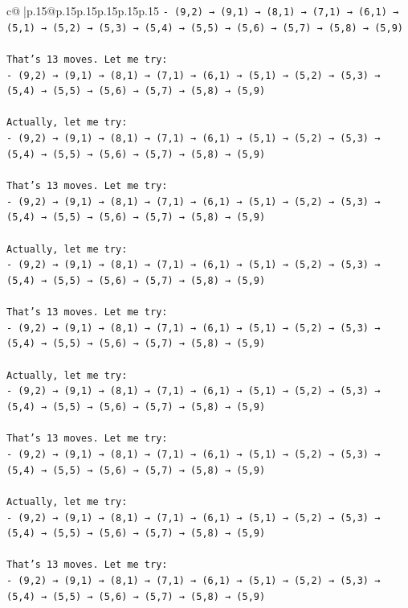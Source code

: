 \documentclass{article}
\begin{document}
{\begin{supertabular}{c@{$\;$}|p{.15\linewidth}@{}p{.15\linewidth}p{.15\linewidth}p{.15\linewidth}p{.15\linewidth}p{.15\linewidth}}
{{{\texttt{{-} (9,2) → (9,1) → (8,1) → (7,1) → (6,1) → (5,1) → (5,2) → (5,3) → (5,4) → (5,5) → (5,6) → (5,7) → (5,8) → (5,9)} \\
\\ 
\texttt{That's 13 moves. Let me try:} \\
\texttt{{-} (9,2) → (9,1) → (8,1) → (7,1) → (6,1) → (5,1) → (5,2) → (5,3) → (5,4) → (5,5) → (5,6) → (5,7) → (5,8) → (5,9)} \\
\\ 
\texttt{Actually, let me try:} \\
\texttt{{-} (9,2) → (9,1) → (8,1) → (7,1) → (6,1) → (5,1) → (5,2) → (5,3) → (5,4) → (5,5) → (5,6) → (5,7) → (5,8) → (5,9)} \\
\\ 
\texttt{That's 13 moves. Let me try:} \\
\texttt{{-} (9,2) → (9,1) → (8,1) → (7,1) → (6,1) → (5,1) → (5,2) → (5,3) → (5,4) → (5,5) → (5,6) → (5,7) → (5,8) → (5,9)} \\
\\ 
\texttt{Actually, let me try:} \\
\texttt{{-} (9,2) → (9,1) → (8,1) → (7,1) → (6,1) → (5,1) → (5,2) → (5,3) → (5,4) → (5,5) → (5,6) → (5,7) → (5,8) → (5,9)} \\
\\ 
\texttt{That's 13 moves. Let me try:} \\
\texttt{{-} (9,2) → (9,1) → (8,1) → (7,1) → (6,1) → (5,1) → (5,2) → (5,3) → (5,4) → (5,5) → (5,6) → (5,7) → (5,8) → (5,9)} \\
\\ 
\texttt{Actually, let me try:} \\
\texttt{{-} (9,2) → (9,1) → (8,1) → (7,1) → (6,1) → (5,1) → (5,2) → (5,3) → (5,4) → (5,5) → (5,6) → (5,7) → (5,8) → (5,9)} \\
\\ 
\texttt{That's 13 moves. Let me try:} \\
\texttt{{-} (9,2) → (9,1) → (8,1) → (7,1) → (6,1) → (5,1) → (5,2) → (5,3) → (5,4) → (5,5) → (5,6) → (5,7) → (5,8) → (5,9)} \\
\\ 
\texttt{Actually, let me try:} \\
\texttt{{-} (9,2) → (9,1) → (8,1) → (7,1) → (6,1) → (5,1) → (5,2) → (5,3) → (5,4) → (5,5) → (5,6) → (5,7) → (5,8) → (5,9)} \\
\\ 
\texttt{That's 13 moves. Let me try:} \\
\texttt{{-} (9,2) → (9,1) → (8,1) → (7,1) → (6,1) → (5,1) → (5,2) → (5,3) → (5,4) → (5,5) → (5,6) → (5,7) → (5,8) → (5,9)} \\
}}}
\end{supertabular}}
\end{document}
